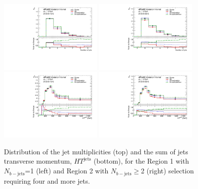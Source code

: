 \begin{figure}[!htb]
\centering
\includegraphics[width=0.45\textwidth]{Plots/ttV/generator/c_Region_0_nJets}
\includegraphics[width=0.45\textwidth]{Plots/ttV/generator/c_Region_1_nJets}\\
\includegraphics[width=0.45\textwidth]{Plots/ttV/generator/c_Region_0_HT_jets}
\includegraphics[width=0.45\textwidth]{Plots/ttV/generator/c_Region_1_HT_jets}\\
  \caption{Distribution of the jet multiplicities (top) and the sum of jets transverse momentum, $HT^{\text{jets}}$ (bottom), for the Region 1 with $N_{b-\mathrm{jets}}$=1 (left) and Region 2 with $N_{b-\mathrm{jets}}\geq$2 (right) selection requiring four and more jets.  \label{ttV:den_4j12b}}
\end{figure}


